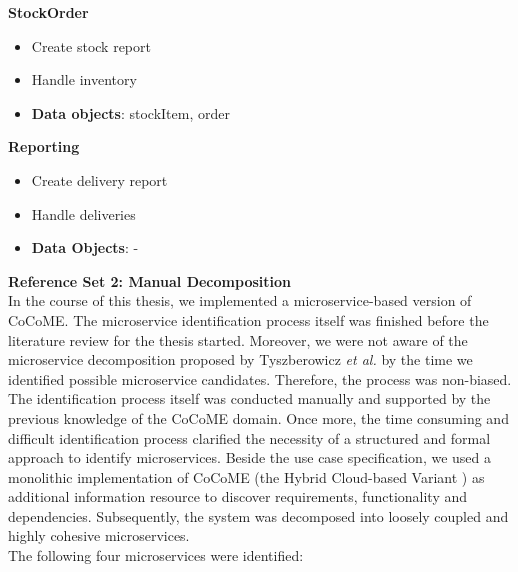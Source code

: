 \begin{multicols}{2}
	\textbf{StockOrder}
	\begin{flushleft}
		\begin{itemize}[noitemsep]
			\item Create stock report
			\item Handle inventory
			\item \textbf{Data objects}: stockItem, order
		\end{itemize}
	\end{flushleft}
	
	
	\vfill
	\columnbreak
	\textbf{Reporting}
	\begin{flushleft}
		\begin{itemize}[noitemsep]
			\item Create delivery report
			\item Handle deliveries
			\item \textbf{Data Objects}: - 
			
		\end{itemize}
	\end{flushleft}
\end{multicols}



\noindent
\textbf{Reference Set 2: Manual Decomposition} \\
In the course of this thesis, we implemented a microservice-based version of CoCoME. The microservice identification process itself was finished before the literature review for the thesis started. Moreover, we were not aware of the microservice decomposition proposed by Tyszberowicz \textit{et al.} \cite{FunctionalDecompositionHeinrich} by the time we identified possible microservice candidates. Therefore, the process was non-biased. \\
The identification process itself was conducted manually and supported by the previous knowledge of the CoCoME domain. Once more, the time consuming and difficult identification process clarified the necessity of a structured and formal approach to identify microservices. Beside the use case specification, we used a monolithic implementation of CoCoME (the Hybrid Cloud-based Variant \cite{CoCoMETechnical}) as additional information resource to discover requirements, functionality and dependencies. Subsequently, the system was decomposed into loosely coupled and highly cohesive microservices. \\
The following four microservices were identified:




